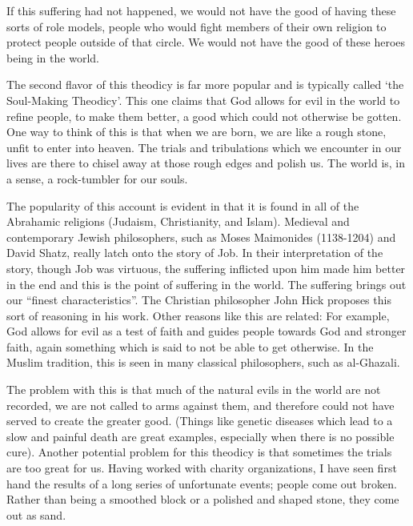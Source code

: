 If this suffering had not happened, we would not have the good of having these sorts of role models, people who would fight members of their own religion to protect people outside of that circle. We would not have the good of these heroes being in the world.

The second flavor of this theodicy is far more popular and is typically called `the Soul-Making Theodicy'. This one claims that God allows for evil in the world to refine people, to make them better, a good which could not otherwise be gotten. One way to think of this is that when we are born, we are like a rough stone, unfit to enter into heaven. The trials and tribulations which we encounter in our lives are there to chisel away at those rough edges and polish us. The world is, in a sense, a rock-tumbler for our souls. 

The popularity of this account is evident in that it is found in all of the Abrahamic religions (Judaism, Christianity, and Islam). Medieval and contemporary Jewish philosophers, such as Moses Maimonides (1138-1204)\autocite{Maimonides1} and David Shatz\autocite{Shatz1}, really latch onto the story of Job. In their interpretation of the story, though Job was virtuous, the suffering inflicted upon him made him better in the end and this is the point of suffering in the world. The suffering brings out our ``finest characteristics''.  The Christian philosopher John Hick proposes this sort of reasoning in his work.\autocite{Hick1} Other reasons like this are related: For example, God allows for evil as a test of faith and guides people towards God and stronger faith, again something which is said to not be able to get otherwise. In the Muslim tradition, this is seen in many classical philosophers, such as al-Ghazali.\autocite{Rouzati1}

The problem with this is that much of the natural evils in the world are not recorded, we are not called to arms against them, and therefore could not have served to create the greater good. (Things like genetic diseases which lead to a slow and painful death are great examples, especially when there is no possible cure). Another potential problem for this theodicy is that sometimes the trials are too great for us. Having worked with charity organizations, I have seen first hand the results of a long series of unfortunate events; people come out broken. Rather than being a smoothed block or a polished and shaped stone, they come out as sand. 

